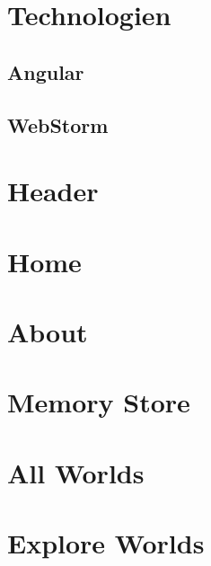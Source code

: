 
\section{Technologien}

\subsection{Angular}

\subsection{WebStorm}

\section{Header}

\section{Home}

\section{About}

\section{Memory Store}

\section{All Worlds}

\section{Explore Worlds}